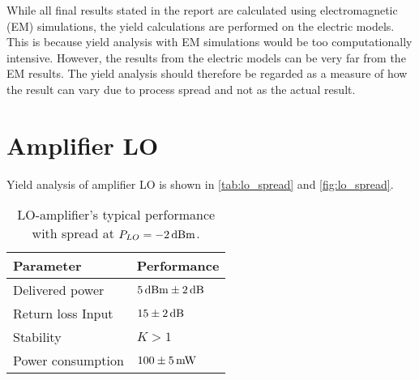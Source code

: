 		While all final results stated in the report are calculated using electromagnetic (EM) simulations, the yield calculations are performed on the electric models. This is because yield analysis with EM simulations would be too computationally intensive. However, the results from the electric models can be very far from the EM results. The yield analysis should therefore be regarded as a measure of how the result can vary due to process spread and not as the actual result.


	\section{Amplifier LO}\label{yieldlo}
		Yield analysis of amplifier LO is shown in \autoref{tab:lo_spread} and \autoref{fig:lo_spread}.


		\begin{table}[hbt!]
			\caption[LO-amplifier's performance with spread.]{LO-amplifier's typical performance with spread at $P_{LO}=\unit[-2]{dBm}$.}
			\label{tab:lo_spread}
			\centering
			\begin{tabular}{ l l } \toprule
				Parameter & Performance \\\midrule
				Delivered power & $\unit[5]{dBm}\unit[\pm2]{dB}$ \\
				Return loss Input & $\unit[15\pm2 ]{dB}$ \\
				Stability & $K>1$ \\
				Power consumption &  $\unit[100\pm 5]{mW}$ \\\bottomrule
			\end{tabular}
		\end{table}


